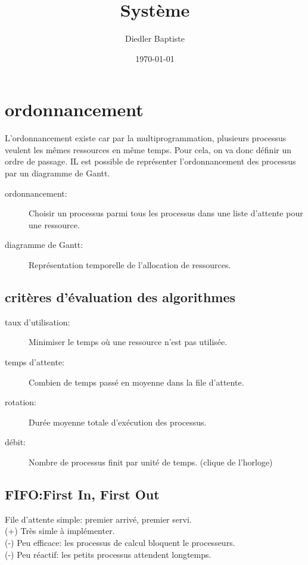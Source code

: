 \documentclass[a4paper, 9pt]{article}
\date{\today}
\author{Diedler Baptiste}
\title{Système}
\begin{document}
    \maketitle
    \section{ordonnancement}
        L'ordonnancement existe car par la multiprogrammation, plusieurs processus veulent les mêmes ressources en  même temps. 
        Pour cela, on va donc définir un ordre de passage. IL est possible de représenter l'ordonnancement des processus par un diagramme de Gantt.
        \begin{description}
            \item[ordonnancement:] Choisir un processus parmi tous les processus dans une liste d’attente pour une ressource.
            \item[diagramme de Gantt:] Représentation temporelle de l’allocation de ressources.
        \end{description}
        \subsection{critères d'évaluation des algorithmes}
            \begin{description}
                \item[taux d'utilisation:] Minimiser le temps où une ressource n'est pas utilisée.
                \item[temps d'attente:] Combien de temps passé en moyenne dans la file d'attente.
                \item[rotation:] Durée moyenne totale d'exécution des processus.
                \item[débit:] Nombre de processus finit par unité de temps. (clique de l'horloge)
            \end{description}
        \subsection{FIFO:First In, First Out}
            \begin{description}[style=nextline]
                \item[FIFO:]
                    File d’attente simple: premier arrivé, premier servi.\\
                    (+) Très simle à implémenter.\\
                    (-) Peu efficace: les processus de calcul bloquent le processeurs.\\
                    (-) Peu réactif: les petits processus attendent longtemps.
            \end{description}
\end{document}
